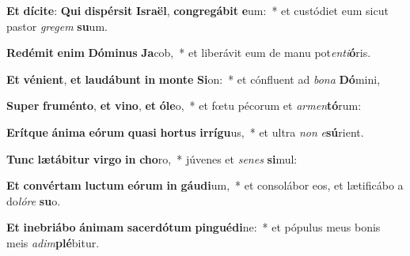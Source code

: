\item \textbf{Et} \textbf{dí}\textbf{ci}\textbf{te}: \textbf{Qui} \textbf{di}\textbf{spér}\textbf{sit} \textbf{Is}\textbf{ra}\textbf{ël}, \textbf{con}\textbf{gre}\textbf{gá}\textbf{bit} \textbf{e}um:~* et custódiet eum sicut pastor \textit{gre}\textit{gem} \textbf{su}um.
\item \textbf{Red}\textbf{é}\textbf{mit} \textbf{e}\textbf{nim} \textbf{Dó}\textbf{mi}\textbf{nus} \textbf{Ja}cob,~* et liberávit eum de manu pot\textit{en}\textit{ti}\textbf{ó}ris.
\item \textbf{Et} \textbf{vé}\textbf{ni}\textbf{ent}, \textbf{et} \textbf{lau}\textbf{dá}\textbf{bunt} \textbf{in} \textbf{mon}\textbf{te} \textbf{Si}on:~* et cónfluent ad \textit{bo}\textit{na} \textbf{Dó}mini,
\item \textbf{Su}\textbf{per} \textbf{fru}\textbf{mén}\textbf{to}, \textbf{et} \textbf{vi}\textbf{no}, \textbf{et} \textbf{ó}\textbf{le}o,~* et fœtu pécorum et \textit{ar}\textit{men}\textbf{tó}rum:
\item \textbf{E}\textbf{rít}\textbf{que} \textbf{á}\textbf{ni}\textbf{ma} \textbf{e}\textbf{ó}\textbf{rum} \textbf{qua}\textbf{si} \textbf{hor}\textbf{tus} \textbf{ir}\textbf{rí}\textbf{gu}us,~* et ultra \textit{non} \textit{e}\textbf{sú}rient.
\item \textbf{Tunc} \textbf{læ}\textbf{tá}\textbf{bi}\textbf{tur} \textbf{vir}\textbf{go} \textbf{in} \textbf{cho}ro,~* júvenes et \textit{se}\textit{nes} \textbf{si}mul:
\item \textbf{Et} \textbf{con}\textbf{vér}\textbf{tam} \textbf{luc}\textbf{tum} \textbf{e}\textbf{ó}\textbf{rum} \textbf{in} \textbf{gáu}\textbf{di}um,~* et consolábor eos, et lætificábo a do\textit{ló}\textit{re} \textbf{su}o.
\item \textbf{Et} \textbf{in}\textbf{e}\textbf{bri}\textbf{á}\textbf{bo} \textbf{á}\textbf{ni}\textbf{mam} \textbf{sa}\textbf{cer}\textbf{dó}\textbf{tum} \textbf{pin}\textbf{gué}\textbf{di}ne:~* et pópulus meus bonis meis \textit{ad}\textit{im}\textbf{plé}bitur.
